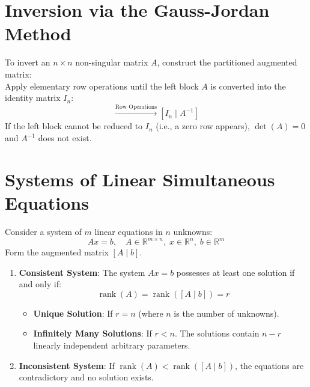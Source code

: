 \section{Inversion via the Gauss-Jordan Method}
To invert an $n \times n$ non-singular matrix $A$, construct the partitioned augmented matrix:
\begin{equation}
[A \mid I_n]
\end{equation}
Apply elementary row operations until the left block $A$ is converted into the identity matrix $I_n$:
\begin{equation}
[A \mid I_n] \xrightarrow{\text{Row Operations}} [I_n \mid A^{-1}]
\end{equation}
If the left block cannot be reduced to $I_n$ (i.e., a zero row appears), $\det(A) = 0$ and $A^{-1}$ does not exist.

\section{Systems of Linear Simultaneous Equations}
Consider a system of $m$ linear equations in $n$ unknowns:
\begin{equation}
Ax = b, \quad A \in \mathbb{R}^{m \times n}, \; x \in \mathbb{R}^n, \; b \in \mathbb{R}^m
\end{equation}
Form the augmented matrix $[A \mid b]$.

\begin{theorem}
\begin{enumerate}
    \item \textbf{Consistent System}: The system $Ax = b$ possesses at least one solution if and only if:
    \begin{equation}
    \operatorname{rank}(A) = \operatorname{rank}([A \mid b]) = r
    \end{equation}
    \begin{itemize}
        \item \textbf{Unique Solution}: If $r = n$ (where $n$ is the number of unknowns).
        \item \textbf{Infinitely Many Solutions}: If $r < n$. The solutions contain $n - r$ linearly independent arbitrary parameters.
    \end{itemize}
    \item \textbf{Inconsistent System}: If $\operatorname{rank}(A) < \operatorname{rank}([A \mid b])$, the equations are contradictory and no solution exists.
\end{enumerate}
\end{theorem}

